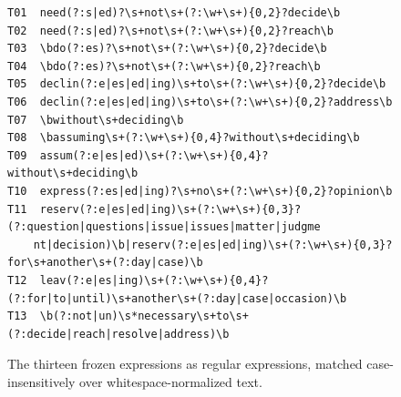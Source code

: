 \begin{figure}[t]
\centering\scriptsize
\begin{verbatim}
T01  need(?:s|ed)?\s+not\s+(?:\w+\s+){0,2}?decide\b
T02  need(?:s|ed)?\s+not\s+(?:\w+\s+){0,2}?reach\b
T03  \bdo(?:es)?\s+not\s+(?:\w+\s+){0,2}?decide\b
T04  \bdo(?:es)?\s+not\s+(?:\w+\s+){0,2}?reach\b
T05  declin(?:e|es|ed|ing)\s+to\s+(?:\w+\s+){0,2}?decide\b
T06  declin(?:e|es|ed|ing)\s+to\s+(?:\w+\s+){0,2}?address\b
T07  \bwithout\s+deciding\b
T08  \bassuming\s+(?:\w+\s+){0,4}?without\s+deciding\b
T09  assum(?:e|es|ed)\s+(?:\w+\s+){0,4}?without\s+deciding\b
T10  express(?:es|ed|ing)?\s+no\s+(?:\w+\s+){0,2}?opinion\b
T11  reserv(?:e|es|ed|ing)\s+(?:\w+\s+){0,3}?(?:question|questions|issue|issues|matter|judgme
    nt|decision)\b|reserv(?:e|es|ed|ing)\s+(?:\w+\s+){0,3}?for\s+another\s+(?:day|case)\b
T12  leav(?:e|es|ing)\s+(?:\w+\s+){0,4}?(?:for|to|until)\s+another\s+(?:day|case|occasion)\b
T13  \b(?:not|un)\s*necessary\s+to\s+(?:decide|reach|resolve|address)\b
\end{verbatim}
\caption{The thirteen frozen expressions as regular expressions, matched case-insensitively over whitespace-normalized text.}
\label{tab:regex}
\end{figure}
